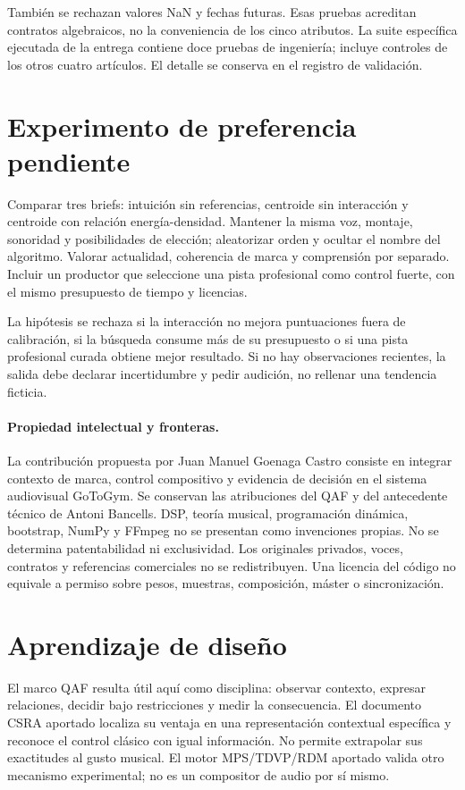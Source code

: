 \documentclass[11pt,a4paper]{article}
\begin{document}
También se rechazan valores NaN y fechas futuras. Esas pruebas acreditan contratos algebraicos, no la conveniencia de los cinco atributos. La suite específica ejecutada de la entrega contiene doce pruebas de ingeniería; incluye controles de los otros cuatro artículos. El detalle se conserva en el registro de validación.
\section{Experimento de preferencia pendiente}
Comparar tres briefs: intuición sin referencias, centroide sin interacción y centroide con relación energía-densidad. Mantener la misma voz, montaje, sonoridad y posibilidades de elección; aleatorizar orden y ocultar el nombre del algoritmo. Valorar actualidad, coherencia de marca y comprensión por separado. Incluir un productor que seleccione una pista profesional como control fuerte, con el mismo presupuesto de tiempo y licencias.

La hipótesis se rechaza si la interacción no mejora puntuaciones fuera de calibración, si la búsqueda consume más de su presupuesto o si una pista profesional curada obtiene mejor resultado. Si no hay observaciones recientes, la salida debe declarar incertidumbre y pedir audición, no rellenar una tendencia ficticia.

\newpage
\paragraph{Propiedad intelectual y fronteras.}
La contribución propuesta por Juan Manuel Goenaga Castro consiste en integrar contexto de marca, control compositivo y evidencia de decisión en el sistema audiovisual GoToGym. Se conservan las atribuciones del QAF y del antecedente técnico de Antoni Bancells. DSP, teoría musical, programación dinámica, bootstrap, NumPy y FFmpeg no se presentan como invenciones propias. No se determina patentabilidad ni exclusividad. Los originales privados, voces, contratos y referencias comerciales no se redistribuyen. Una licencia del código no equivale a permiso sobre pesos, muestras, composición, máster o sincronización.
\section{Aprendizaje de diseño}
El marco QAF resulta útil aquí como disciplina: observar contexto, expresar relaciones, decidir bajo restricciones y medir la consecuencia. El documento CSRA aportado localiza su ventaja en una representación contextual específica y reconoce el control clásico con igual información. No permite extrapolar sus exactitudes al gusto musical. El motor MPS/TDVP/RDM aportado valida otro mecanismo experimental; no es un compositor de audio por sí mismo.
\end{document}
